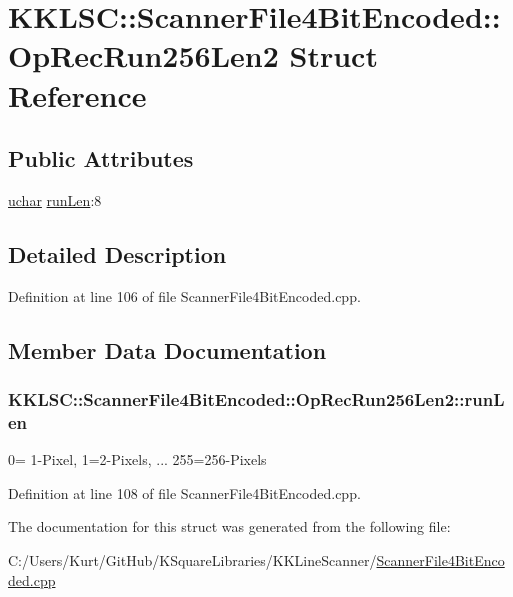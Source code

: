 \hypertarget{struct_scanner_file4_bit_encoded_1_1_op_rec_run256_len2}{}\section{K\+K\+L\+SC\+:\+:Scanner\+File4\+Bit\+Encoded\+:\+:Op\+Rec\+Run256\+Len2 Struct Reference}
\label{struct_scanner_file4_bit_encoded_1_1_op_rec_run256_len2}
\subsection*{Public Attributes}
\begin{DoxyCompactItemize}
\item 
\hyperlink{namespace_k_k_b_ace9969169bf514f9ee6185186949cdf7}{uchar} \hyperlink{struct_scanner_file4_bit_encoded_1_1_op_rec_run256_len2_af6bff3c75852f5f473c93c00a108d678}{run\+Len}\+:8
\end{DoxyCompactItemize}


\subsection{Detailed Description}


Definition at line 106 of file Scanner\+File4\+Bit\+Encoded.\+cpp.



\subsection{Member Data Documentation}
\subsubsection[{\texorpdfstring{run\+Len}{runLen}}]{ K\+K\+L\+S\+C\+::\+Scanner\+File4\+Bit\+Encoded\+::\+Op\+Rec\+Run256\+Len2\+::run\+Len}\hypertarget{struct_scanner_file4_bit_encoded_1_1_op_rec_run256_len2_af6bff3c75852f5f473c93c00a108d678}{}\label{struct_scanner_file4_bit_encoded_1_1_op_rec_run256_len2_af6bff3c75852f5f473c93c00a108d678}
0= 1-\/\+Pixel, 1=2-\/\+Pixels, ... 255=256-\/\+Pixels 

Definition at line 108 of file Scanner\+File4\+Bit\+Encoded.\+cpp.



The documentation for this struct was generated from the following file\+:\begin{DoxyCompactItemize}
\item 
C\+:/\+Users/\+Kurt/\+Git\+Hub/\+K\+Square\+Libraries/\+K\+K\+Line\+Scanner/\hyperlink{_scanner_file4_bit_encoded_8cpp}{Scanner\+File4\+Bit\+Encoded.\+cpp}\end{DoxyCompactItemize}
